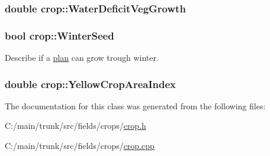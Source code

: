 \label{classcrop_a4a332805f2e6027e5e2e18e2bf7cae17}
\hypertarget{classcrop_a5eb2d5b9554ecd6e8f7f32b229509b67}{
\subsubsection[{WaterDeficitVegGrowth}]{\setlength{\rightskip}{0pt plus 5cm}double {\bf crop::WaterDeficitVegGrowth}}}
\label{classcrop_a5eb2d5b9554ecd6e8f7f32b229509b67}
\hypertarget{classcrop_a7b2a38633965734c3298a4da248c6d53}{
\subsubsection[{WinterSeed}]{\setlength{\rightskip}{0pt plus 5cm}bool {\bf crop::WinterSeed}}}
\label{classcrop_a7b2a38633965734c3298a4da248c6d53}


Describe if a \hyperlink{classplan}{plan} can grow trough winter. \hypertarget{classcrop_a7acb3fa412808c819f4d9b662cc2148c}{
\subsubsection[{YellowCropAreaIndex}]{\setlength{\rightskip}{0pt plus 5cm}double {\bf crop::YellowCropAreaIndex}}}
\label{classcrop_a7acb3fa412808c819f4d9b662cc2148c}


The documentation for this class was generated from the following files:\begin{DoxyCompactItemize}
\item 
C:/main/trunk/src/fields/crops/\hyperlink{crop_8h}{crop.h}\item 
C:/main/trunk/src/fields/crops/\hyperlink{crop_8cpp}{crop.cpp}\end{DoxyCompactItemize}
